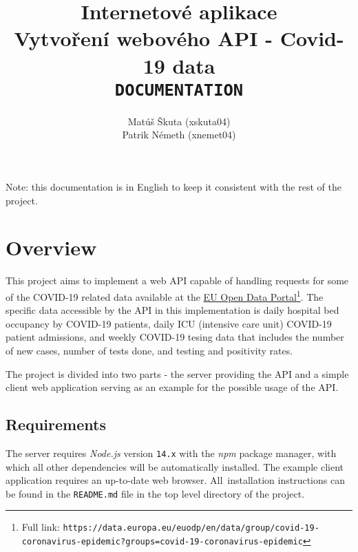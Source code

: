 \documentclass[pdftex, 11pt, a4paper]{article}
\newcommand{\code}{\texttt}
\begin{document}
    \title{Internetové aplikace \\
        Vytvoření webového API - Covid-19 data \\\vspace{0.5cm}
        \code{DOCUMENTATION}}
    \author{Matúš Škuta (xskuta04) \\ Patrik Németh (xnemet04)}
    \maketitle

    \begin{center}
        Note: this documentation is in English to keep it consistent with the rest of
        the project.
    \end{center}

    \section{Overview}
    This project aims to implement a web API capable of handling requests for some of
    the COVID-19 related data available at the
    \href{https://data.europa.eu/euodp/en/data/group/covid-19-coronavirus-epidemic?groups=covid-19-coronavirus-epidemic}
        {EU Open Data Portal}\footnote{Full link: \code{https://data.europa.eu/euodp/en/data/group/covid-19-coronavirus-epidemic?groups=\newline{}covid-19-coronavirus-epidemic}}.
    The specific data accessible by the API in this implementation is daily hospital bed
    occupancy by COVID-19 patients, daily ICU (intensive care unit) COVID-19 patient
    admissions, and weekly COVID-19 tesing data that includes the number of new cases,
    number of tests done, and testing and positivity rates.

    The project is divided into two parts - the server providing the API and a simple
    client web application serving as an example for the possible usage of the API.

    \subsection{Requirements}
    The server requires \emph{Node.js} version \code{14.x} with the \emph{npm} package manager, with which
    all other dependencies will be automatically installed. The example client
    application requires an up-to-date web browser. All~installation instructions
    can be found in the \code{README.md} file in the top level directory of the project.
\end{document}
